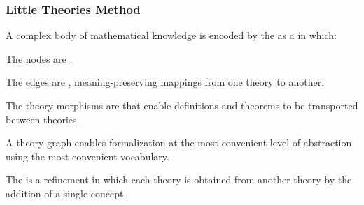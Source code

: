 \documentclass[t,12pt,numbers,fleqn]{beamer}
\begin{document}
\begin{frame}
\frametitle{Little Theories Method {\small \bbrown{[FGT92]}}}
\bi

  \item A complex body of mathematical knowledge is encoded by the
     as a 
    \bbrown{[Kol14]} in which:

  \be

    \item The nodes are .

    \item The edges are , meaning-preserving
      mappings from one theory to another.

  \ee

  \item The theory morphisms are  that
    enable definitions and theorems to be transported between
    theories.

  \item A theory graph enables formalization at the most convenient
    level of abstraction using the most convenient vocabulary.

  \item The  is a refinement in which each
    theory is obtained from another theory by the addition of a single
    concept.

\ei
\end{frame}

\end{document}
